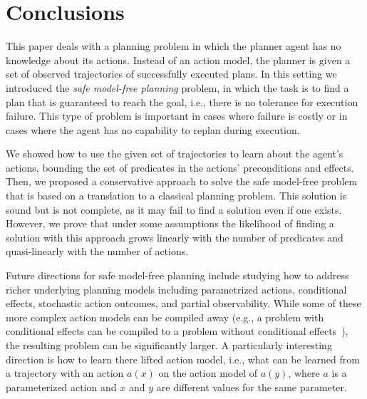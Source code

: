 \documentclass{article}
\begin{document}
	
	
	
	
	
	
	\section{Conclusions}
	This paper deals with a planning problem in which the planner agent has no knowledge about its actions. Instead of an action model, the planner is given a set of observed trajectories of successfully executed plans. 	In this setting we introduced the {\em safe model-free planning} problem, in which the task is to find a plan that is guaranteed to reach the goal, i.e., there is no tolerance for execution failure. This type of problem is important in cases where failure is costly or in cases where the agent has no capability to replan during execution.
	
	 
	We showed how to use the given set of trajectories to learn
	about the agent's actions, bounding the set of predicates in the actions'  preconditions and effects. Then, we proposed a conservative approach to solve the safe model-free problem that is based on a translation to a classical planning problem. This solution is sound but is not complete, as it may fail to find a solution even if one exists. However, we prove that under some assumptions the likelihood of finding a solution with this approach grows linearly with the number of predicates and quasi-linearly with the number of actions. 
	
	
	Future directions for safe model-free planning include studying how to address richer underlying planning models including parametrized actions, conditional effects, stochastic action outcomes, and partial observability. While some of these more complex action models can be compiled away (e.g., a problem with conditional effects can be compiled to a problem without conditional effects~\cite{nebel2000compilability}), the resulting problem can be significantly larger. A particularly interesting direction is how to learn there lifted action model, i.e., 
	what can be learned from a trajectory 
	with an action $a(x)$ on the action 
	model of $a(y)$, where $a$ is a parameterized action and $x$ and $y$ are different values for the same parameter.
	
\end{document}
